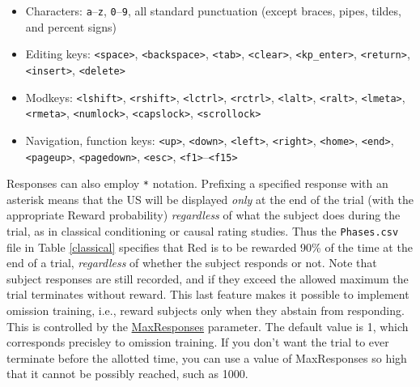 \documentclass[11pt,]{article}
\begin{document}
\begin{itemize}
\item
  Characters: \texttt{a}--\texttt{z}, \texttt{0}--\texttt{9}, all
  standard punctuation (except braces, pipes, tildes, and percent signs)
\item
  Editing keys: \texttt{\textless{}space\textgreater{}},
  \texttt{\textless{}backspace\textgreater{}},
  \texttt{\textless{}tab\textgreater{}},
  \texttt{\textless{}clear\textgreater{}},
  \texttt{\textless{}kp\_enter\textgreater{}},
  \texttt{\textless{}return\textgreater{}},
  \texttt{\textless{}insert\textgreater{}},
  \texttt{\textless{}delete\textgreater{}}
\item
  Modkeys: \texttt{\textless{}lshift\textgreater{}},
  \texttt{\textless{}rshift\textgreater{}},
  \texttt{\textless{}lctrl\textgreater{}},
  \texttt{\textless{}rctrl\textgreater{}},
  \texttt{\textless{}lalt\textgreater{}},
  \texttt{\textless{}ralt\textgreater{}},
  \texttt{\textless{}lmeta\textgreater{}},
  \texttt{\textless{}rmeta\textgreater{}},
  \texttt{\textless{}numlock\textgreater{}},
  \texttt{\textless{}capslock\textgreater{}},
  \texttt{\textless{}scrollock\textgreater{}}
\item
  Navigation, function keys: \texttt{\textless{}up\textgreater{}},
  \texttt{\textless{}down\textgreater{}},
  \texttt{\textless{}left\textgreater{}},
  \texttt{\textless{}right\textgreater{}},
  \texttt{\textless{}home\textgreater{}},
  \texttt{\textless{}end\textgreater{}},
  \texttt{\textless{}pageup\textgreater{}},
  \texttt{\textless{}pagedown\textgreater{}},
  \texttt{\textless{}esc\textgreater{}},
  \texttt{\textless{}f1\textgreater{}}--\texttt{\textless{}f15\textgreater{}}
\end{itemize}

Responses can also employ \texttt{*} notation. Prefixing a specified
response with an asterisk means that the US will be displayed
\emph{only} at the end of the trial (with the appropriate Reward
probability) \emph{regardless} of what the subject does during the
trial, as in classical conditioning or causal rating studies. Thus the
\texttt{Phases.csv} file in Table \ref{classical} specifies that Red is
to be rewarded 90\% of the time at the end of a trial, \emph{regardless}
of whether the subject responds or not. Note that subject responses are
still recorded, and if they exceed the allowed maximum the trial
terminates without reward. This last feature makes it possible to
implement omission training, i.e., reward subjects only when they
abstain from responding. This is controlled by the
\hyperref[maxresponses]{MaxResponses} parameter. The default value is 1,
which corresponds precisley to omission training. If you don't want the
trial to ever terminate before the allotted time, you can use a value of
MaxResponses so high that it cannot be possibly reached, such as 1000.
\end{document}
